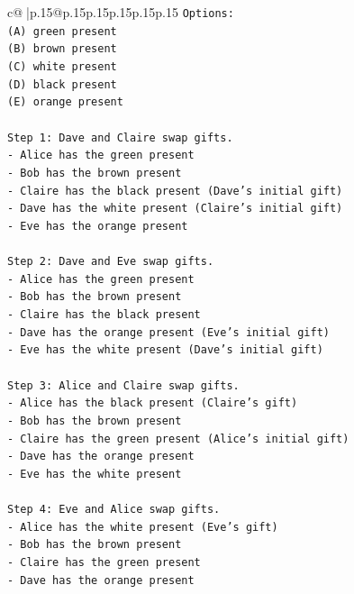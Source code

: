\documentclass{article}
\begin{document}
{\begin{supertabular}{c@{$\;$}|p{.15\linewidth}@{}p{.15\linewidth}p{.15\linewidth}p{.15\linewidth}p{.15\linewidth}p{.15\linewidth}}
{{{\texttt{Options:} \\
\texttt{(A) green present} \\
\texttt{(B) brown present} \\
\texttt{(C) white present} \\
\texttt{(D) black present} \\
\texttt{(E) orange present} \\
\\ 
\texttt{Step 1: Dave and Claire swap gifts.} \\
\texttt{{-} Alice has the green present} \\
\texttt{{-} Bob has the brown present} \\
\texttt{{-} Claire has the black present (Dave's initial gift)} \\
\texttt{{-} Dave has the white present (Claire's initial gift)} \\
\texttt{{-} Eve has the orange present} \\
\\ 
\texttt{Step 2: Dave and Eve swap gifts.} \\
\texttt{{-} Alice has the green present} \\
\texttt{{-} Bob has the brown present} \\
\texttt{{-} Claire has the black present} \\
\texttt{{-} Dave has the orange present (Eve's initial gift)} \\
\texttt{{-} Eve has the white present (Dave's initial gift)} \\
\\ 
\texttt{Step 3: Alice and Claire swap gifts.} \\
\texttt{{-} Alice has the black present (Claire's gift)} \\
\texttt{{-} Bob has the brown present} \\
\texttt{{-} Claire has the green present (Alice's initial gift)} \\
\texttt{{-} Dave has the orange present} \\
\texttt{{-} Eve has the white present} \\
\\ 
\texttt{Step 4: Eve and Alice swap gifts.} \\
\texttt{{-} Alice has the white present (Eve's gift)} \\
\texttt{{-} Bob has the brown present} \\
\texttt{{-} Claire has the green present} \\
\texttt{{-} Dave has the orange present} \\
}}}
\end{supertabular}}
\end{document}
